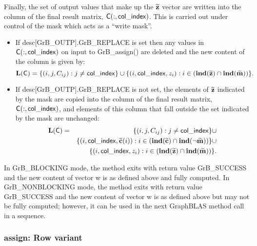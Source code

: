 Finally, the set of output values that make up the ${\bf \widetilde{z}}$ 
vector are written into the column of the final result matrix, 
${\sf C}(:,{\sf col\_index})$.  This is carried out under control of the mask 
which acts as a ``write mask''.
\begin{itemize}
    \item If {\sf desc[GrB\_OUTP].GrB\_REPLACE} is set then any values in 
    ${\sf C}(:,{\sf col\_index})$ on input to {\sf GrB\_assign()} are deleted 
    and the new content of the column is given by:
    \[ 
		\bold{L}({\sf C}) = \{ (i,j,C_{ij}) : j \neq {\sf col\_index} \} \cup \{(i,{\sf col\_index},z_{i}) : i \in 
    (\bold{ind}({\bf \widetilde{z}}) \cap \bold{ind}({\bf \widetilde{m}})) \}. 
    \]

    \item If {\sf desc[GrB\_OUTP].GrB\_REPLACE} is not set, the elements of 
    ${\bf \widetilde{z}}$ indicated by the mask are copied into the column 
    of the final result matrix, ${\sf C}(:,{\sf col\_index})$, and elements of 
    this column that fall outside the set indicated by the mask are unchanged:
		\begin{eqnarray} 
			\bold{L}({\sf C}) & = & \{ (i,j,C_{ij}) : j \neq {\sf col\_index} \} \cup \nonumber \\
			& & \{(i,{\sf col\_index},{\bf \widetilde{c}}(i)) : i \in (\bold{ind}({\bf \widetilde{c}}) 
		\cap \bold{ind}(\neg {\bf \widetilde{m}})) \} \cup \nonumber \\
			& & \{(i,{\sf col\_index},z_{i}) : i \in 
    (\bold{ind}({\bf \widetilde{z}}) \cap \bold{ind}({\bf \widetilde{m}})) \}. \nonumber
		\end{eqnarray}
\end{itemize}

In {\sf GrB\_BLOCKING} mode, the method exits with return value 
{\sf GrB\_SUCCESS} and the new content of vector {\sf w} is as defined above
and fully computed.  
In {\sf GrB\_NONBLOCKING} mode, the method exits with return value 
{\sf GrB\_SUCCESS} and the new content of vector {\sf w} is as defined above 
but may not be fully computed; however, it can be used in the next GraphBLAS 
method call in a sequence.


\subsubsection{{\sf assign}: Row variant}

